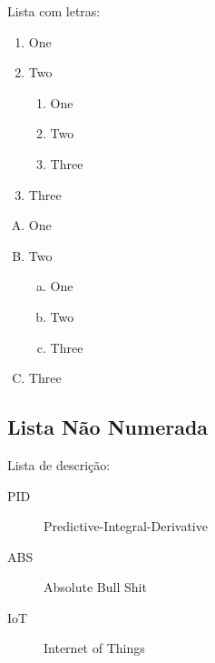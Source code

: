 Lista com letras:

\begin{enumerate}[A]
  \item One
  \item Two
        \begin{enumerate}[a]
          \item One
          \item Two
          \item Three
        \end{enumerate}
  \item Three
\end{enumerate}

\begin{enumerate}[(A)]
  \item One
  \item Two
        \begin{enumerate}[(a)]
          \item One
          \item Two
          \item Three
        \end{enumerate}
  \item Three
\end{enumerate}%

\subsection{Lista Não Numerada}

Lista de descrição:

\begin{description}
  \item[PID] Predictive-Integral-Derivative
  \item[ABS] Absolute Bull Shit
  \item[IoT] Internet of Things
\end{description}
